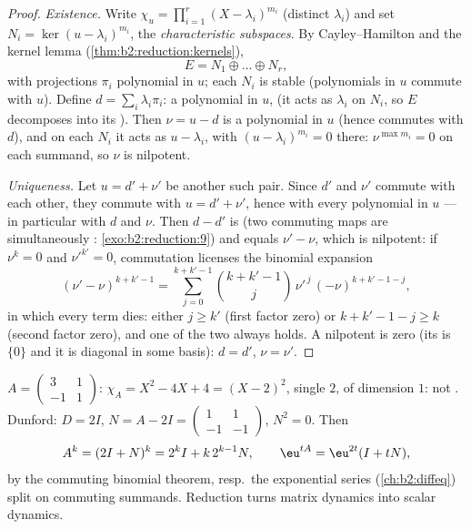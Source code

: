 \begin{proof}
\emph{Existence.} Write $\chi_u = \prod_{i=1}^{r} (X -
\lambda_i)^{m_i}$ (distinct $\lambda_i$) and set $N_i = \ker(u -
\lambda_i)^{m_i}$, the \emph{characteristic subspaces}. By
Cayley--Hamilton and the kernel lemma
(\cref{thm:b2:reduction:kernels}),
\[
E = N_1 \oplus \dots \oplus N_r ,
\]
with projections $\pi_i$ polynomial in $u$; each $N_i$ is stable
(polynomials in $u$ commute with $u$). Define $d = \sum_i \lambda_i
\pi_i$: a polynomial in $u$,  (it acts as $\lambda_i$
on $N_i$, so $E$ decomposes into its ). Then $\nu = u -
d$ is a polynomial in $u$ (hence commutes with $d$), and on each
$N_i$ it acts as $u - \lambda_i$, with $(u - \lambda_i)^{m_i} = 0$
there: $\nu^{\max m_i} = 0$ on each summand, so $\nu$ is nilpotent.

\emph{Uniqueness.} Let $u = d' + \nu'$ be another such pair. Since
$d'$ and $\nu'$ commute with each other, they commute with $u = d' +
\nu'$, hence with every polynomial in $u$ --- in particular with $d$
and $\nu$. Then $d - d'$ is  (two commuting
 maps are simultaneously :
\cref{exo:b2:reduction:9}) and equals $\nu' - \nu$, which is
nilpotent: if $\nu^k = 0$ and $\nu'^{k'} = 0$, commutation
licenses the binomial expansion
\[
(\nu' - \nu)^{k + k' - 1}
= \sum_{j=0}^{k+k'-1}\binom{k + k' - 1}{j}
\,\nu'^{\,j}\,(-\nu)^{k + k' - 1 - j} ,
\]
in which every term dies: either $j \geq k'$ (first factor
zero) or $k + k' - 1 - j \geq k$ (second factor zero), and one
of the two always holds. A  nilpotent is zero (its
 is $\{0\}$ and it is diagonal in some basis): $d = d'$,
$\nu = \nu'$.
\end{proof}

\begin{example}\label{ex:b2:reduction:powers}
$A = \begin{pmatrix} 3 & 1\\ -1 & 1\end{pmatrix}$: $\chi_A = X^2 -
4X + 4 = (X-2)^2$, single  $2$,  of dimension
$1$: not . Dunford: $D = 2I$, $N = A - 2I =
\begin{pmatrix} 1 & 1\\ -1 & -1\end{pmatrix}$, $N^2 = 0$. Then
\[
A^k = (2I + N)^k = 2^k I + k\,2^{k-1} N ,
\qquad
\eu^{tA} = \eu^{2t}(I + tN),
\]
by the commuting binomial theorem, resp.\ the exponential series
(\cref{ch:b2:diffeq}) split on commuting summands. Reduction turns
matrix dynamics into scalar dynamics.
\end{example}

